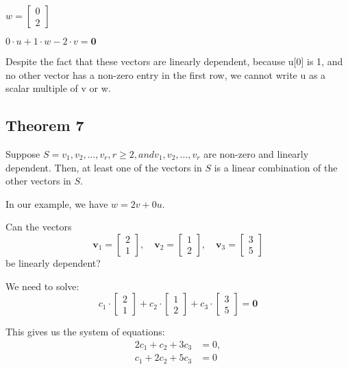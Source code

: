 \documentclass[12pt]{article}
\begin{document}
$w = \begin{bmatrix} 0 \\ 2 \end{bmatrix}$

$0 \cdot u + 1 \cdot w - 2 \cdot v = \mathbf{0}$

Despite the fact that these vectors are linearly dependent, because u[0] is 1,
and no other vector has a non-zero entry in the first row, we cannot write
u as a scalar multiple of v or w.

\subsection{Theorem 7}

Suppose $S={v_1, v_2, \dots, v_r}, r \geq 2, and v_1, v_2, \dots, v_r$ are
non-zero and linearly dependent. Then, at least one of the vectors in $S$ is
a linear combination of the other vectors in $S$.

In our example, we have $w = 2v + 0u$.


Can the vectors 
\[
\mathbf{v}_1 = \begin{bmatrix} 2 \\ 1 \end{bmatrix}, \quad
\mathbf{v}_2 = \begin{bmatrix} 1 \\ 2 \end{bmatrix}, \quad
\mathbf{v}_3 = \begin{bmatrix} 3 \\ 5 \end{bmatrix}
\]
be linearly dependent?

We need to solve:
\[
c_1 \cdot \begin{bmatrix} 2 \\ 1 \end{bmatrix} 
+ c_2 \cdot \begin{bmatrix} 1 \\ 2 \end{bmatrix}
+ c_3 \cdot \begin{bmatrix} 3 \\ 5 \end{bmatrix} = \mathbf{0}
\]

This gives us the system of equations:
\[
\begin{aligned}
2c_1 + c_2 + 3c_3 &= 0, \\
c_1 + 2c_2 + 5c_3 &= 0
\end{aligned}
\]
\end{document}
